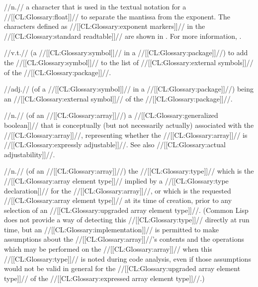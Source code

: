  //n.// a character that is used in the textual notation for a //[[CL:Glossary:float]]// to separate the mantissa from the exponent. The characters defined as //[[CL:Glossary:exponent markers]]// in the //[[CL:Glossary:standard readtable]]// are shown in \thenextfigure. For more information, \seesection\CharacterSyntax. 


 //v.t.// (a //[[CL:Glossary:symbol]]// in a //[[CL:Glossary:package]]//) to add the //[[CL:Glossary:symbol]]// to the list of //[[CL:Glossary:external symbols]]// of the //[[CL:Glossary:package]]//.

 //adj.// (of a //[[CL:Glossary:symbol]]// in a //[[CL:Glossary:package]]//) being an //[[CL:Glossary:external symbol]]// of the //[[CL:Glossary:package]]//.

 //n.// (of an //[[CL:Glossary:array]]//) a //[[CL:Glossary:generalized boolean]]// that is conceptually (but not necessarily actually) associated with the //[[CL:Glossary:array]]//, representing whether the //[[CL:Glossary:array]]// is //[[CL:Glossary:expressly adjustable]]//. See also //[[CL:Glossary:actual adjustability]]//.

 //n.// (of an //[[CL:Glossary:array]]//) the //[[CL:Glossary:type]]// which is the //[[CL:Glossary:array element type]]// implied by a //[[CL:Glossary:type declaration]]// for the //[[CL:Glossary:array]]//, or which is the requested //[[CL:Glossary:array element type]]// at its time of creation, prior to any selection of an //[[CL:Glossary:upgraded array element type]]//. (Common Lisp does not provide a way of detecting this //[[CL:Glossary:type]]// directly at run time, but an //[[CL:Glossary:implementation]]// is permitted to make assumptions about the //[[CL:Glossary:array]]//'s contents and the operations which may be performed on the //[[CL:Glossary:array]]// when this //[[CL:Glossary:type]]// is noted during code analysis, even if those assumptions would not be valid in general for the //[[CL:Glossary:upgraded array element type]]// of the //[[CL:Glossary:expressed array element type]]//.)


